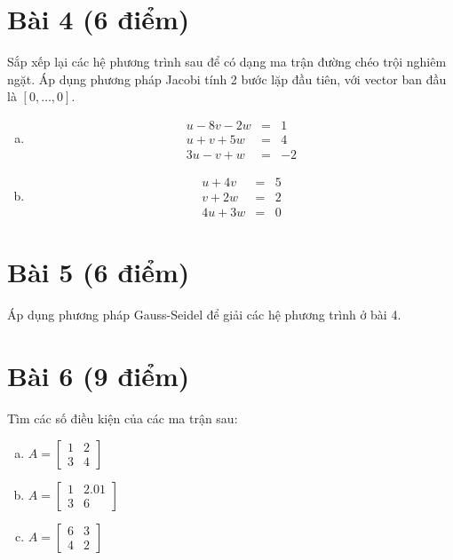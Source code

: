 \documentclass[12pt]{article}
\begin{document}
\section{Bài 4 (6 điểm)}

Sắp xếp lại các hệ phương trình sau để có dạng ma trận đường chéo trội nghiêm ngặt. Áp dụng phương pháp Jacobi tính 2 bước lặp đầu tiên, với vector ban đầu là $[0,\ldots,0]$.

\begin{enumerate}[a)]

\item

  \begin{eqnarray*}
    u - 8v -2w &=& 1\\
    u + v + 5w &=& 4 \\
    3u - v + w &=& -2
  \end{eqnarray*}
    
\item  
 \begin{eqnarray*}
    u + 4v &=& 5\\
    v + 2w &=& 2\\
    4u + 3w&=& 0
  \end{eqnarray*}
  
\end{enumerate}

\section{Bài 5 (6 điểm)}

Áp dụng phương pháp Gauss-Seidel để giải các hệ phương trình ở bài 4.

\section{Bài 6 (9 điểm)}

Tìm các số điều kiện của các ma trận sau:

\begin{enumerate}[a)]

\item $A = \begin{bmatrix}  1 & 2\\ 3 & 4 \end{bmatrix}$

\item $A = \begin{bmatrix} 1 & 2.01 \\ 3 & 6\end{bmatrix}$

\item $A = \begin{bmatrix} 6 & 3 \\ 4 & 2\end{bmatrix}$

\end{enumerate}
\end{document}
